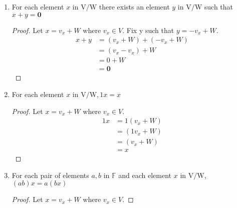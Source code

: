 \documentclass[11pt]{scrartcl}
\begin{document}
\begin{enumerate}[label=\alph*.]
{\begin{enumerate}[label=VS \arabic*:]
{\begin{proof}
			            as $0 + W$, where $0 \in V$.
			            \begin{align*}
				            x + \mathbf{0} & = x + (0 + W)         \\
				                           & = (v_x + W) + (0 + W) \\
				                           & = (v_x + 0) + W       \\
				                           & = v_x + W             \\
				                           & = x
			            \end{align*}
		            \end{proof}
		            }
		      \item{
		            For each element $x$ in $\mathrm{V}/\mathrm{W}$ there exists an element $y$ in $\mathrm{V}/\mathrm{W}$ such that $x+y=\mathbf{0}$
		            \begin{proof}
			            Let $x = v_x + W$ where $v_x \in V$. Fix y such that $y = -v_x + W$.
			            \begin{align*}
				            x + y & = (v_x + W) + (-v_x + W) \\
				                  & = (v_x - v_x) + W        \\
				                  & = 0 + W                  \\
				                  & = \mathbf{0}
			            \end{align*}
		            \end{proof}
		            }
		      \item{
		            For each element $x$ in $\mathrm{V}/\mathrm{W}, 1 x=x$
		            \begin{proof}
			            Let $x = v_x + W$ where $v_x \in V$.
			            \begin{align*}
				            1x & = 1(v_x + W) \\
				               & =(1v_x + W)  \\
				               & = (v_x + W)  \\
				               & = x
			            \end{align*}
		            \end{proof}
		            }
		      \item{
		            For each pair of elements $a, b$ in $\mathbb{F}$ and each element $x$ in $\mathrm{V}/\mathrm{W}$, $(a b) x=a(b x)$
		            \begin{proof}
			            Let $x = v_x + W$ where $v_x \in V$.

\end{proof}}
\end{enumerate}}
\end{enumerate}
\end{document}
